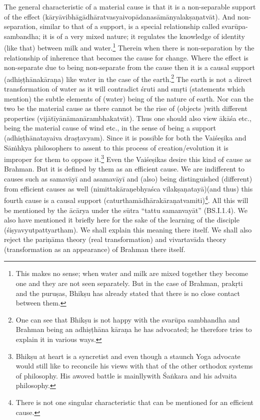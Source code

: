 The general characteristic of a material cause is that it is a non-sepa\-rable support of the effect (kāryāvibhāgādhāratvasyaivopādanasāmān\-yalakṣaṇatvāt). And non-separation, similar to that of a support, is a special relationship called svarūpa-sambandha; it is of a very mixed nature; it regulates the knowledge of identity (like that) between milk and water.\footnote{This makes no sense; when water and milk are mixed together they become one and they are not seen separately. But in the case of Brahman, prakṛti and the puruṣas, Bhikṣu has already stated that there is no close contact between them.} Therein when there is non-separation by the relationship of inherence that becomes the cause for change. Where the effect is non-separate due to being non-separate from the cause then it is a causal support (adhiṣṭhānakāraṇa) like water in the case of the earth.\footnote{One can see that Bhikṣu is not happy with the svarūpa sambhandha and Brahman being an adhiṣṭhāna kāraṇa he has advocated; he therefore tries to explain it in various ways.} The earth is not a direct transformation of water as it will contradict śruti and smṛti (statements which mention) the subtle elements of (water) being of the nature of earth. Nor can the two be the material cause as there cannot be the rise of (objects )with different properties (vijātīyānāmanārambhakatvāt). Thus one should also view ākāśa etc., being the material cause of wind etc., in the sense of being a support (adhiṣṭhānatayaiva draṣṭavyam). Since it is possible for both the Vaiśeṣika and Sāṁhkya philosophers to assent to this process of creation/evolution it is improper for them to oppose it.\footnote{Bhikṣu at heart is a syncretist and even though a staunch Yoga advocate would still like to reconcile his views with that of the other orthodox systems of philosophy. His awoved battle is mainllywith Śaṅkara and his advaita philosophy.} Even the Vaiśeṣikas desire this kind of cause as Brahman. But it is defined by them as an efficient cause. We are indifferent to causes such as samavāyī and asamavāyī and (also) being distinguished (different) from efficient causes as well (nimittakāraṇebhyaśca vilakṣaṇatayā)\break (and thus) this fourth cause is a causal support (caturthamādhārakāra\-ṇatvamiti)\footnote{There is not one singular characteristic that can be mentioned for an efficient cause.}. All this will be mentioned by the ācārya under the sūtra “tattu samanvayāt” (BS.I.1.4). We also have mentioned it briefly here for the sake of the learning of the disciple (śiṣyavyutpattyartham). We shall explain this meaning there itself. We shall also reject the pariṇāma theory (real transformation) and vivartavāda theory (transformation as an appearance) of Brahman there itself. 

